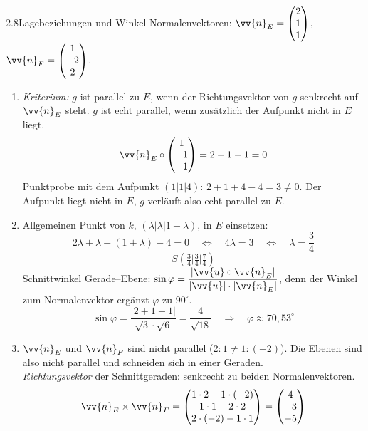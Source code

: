 \begin{loesung}{2.8}{Lagebeziehungen und Winkel}
Normalenvektoren: $\vv{n}_E = \begin{pmatrix} 2\\ 1\\ 1\end{pmatrix}$, $\vv{n}_F = \begin{pmatrix} 1\\ -2\\ 2\end{pmatrix}$.
\begin{enumerate}[label=\alph*)]
  \item \textit{Kriterium:} $g$ ist parallel zu $E$, wenn der Richtungsvektor von $g$ senkrecht auf $\vv{n}_E$ steht. $g$ ist echt parallel, wenn zusätzlich der Aufpunkt nicht in $E$ liegt.
  \[\vv{n}_E\circ\begin{pmatrix} 1\\ -1\\ -1\end{pmatrix} = 2-1-1 = 0\]
  Punktprobe mit dem Aufpunkt $(1|1|4)$: $2+1+4-4 = 3\neq 0$. Der Aufpunkt liegt nicht in $E$, $g$ verläuft also echt parallel zu $E$.
  \item Allgemeinen Punkt von $k$, $(\lambda|\lambda|1+\lambda)$, in $E$ einsetzen:
  \[2\lambda+\lambda+(1+\lambda)-4 = 0\quad\Longleftrightarrow\quad 4\lambda = 3\quad\Longleftrightarrow\quad\lambda = \dfrac{3}{4}\]
  \[S\left(\tfrac{3}{4}\big|\tfrac{3}{4}\big|\tfrac{7}{4}\right)\]
  Schnittwinkel Gerade--Ebene: $\sin{\varphi} = \dfrac{|\vv{u}\circ\vv{n}_E|}{|\vv{u}|\cdot|\vv{n}_E|}$, denn der Winkel zum Normalenvektor ergänzt $\varphi$ zu $90^{\circ}$.
  \[\sin{\varphi} = \dfrac{|2+1+1|}{\sqrt{3}\cdot\sqrt{6}} = \dfrac{4}{\sqrt{18}}\quad\Longrightarrow\quad\varphi\approx 70{,}53^{\circ}\]
  \item $\vv{n}_E$ und $\vv{n}_F$ sind nicht parallel ($2:1 \neq 1:(-2)$). Die Ebenen sind also nicht parallel und schneiden sich in einer Geraden.\\
  \textit{Richtungsvektor} der Schnittgeraden: senkrecht zu beiden Normalenvektoren.
  \[\vv{n}_E\times\vv{n}_F = \begin{pmatrix} 1\cdot 2-1\cdot(-2)\\ 1\cdot 1-2\cdot 2\\ 2\cdot(-2)-1\cdot 1\end{pmatrix} = \begin{pmatrix} 4\\ -3\\ -5\end{pmatrix}\]

\end{enumerate}
\end{loesung}
